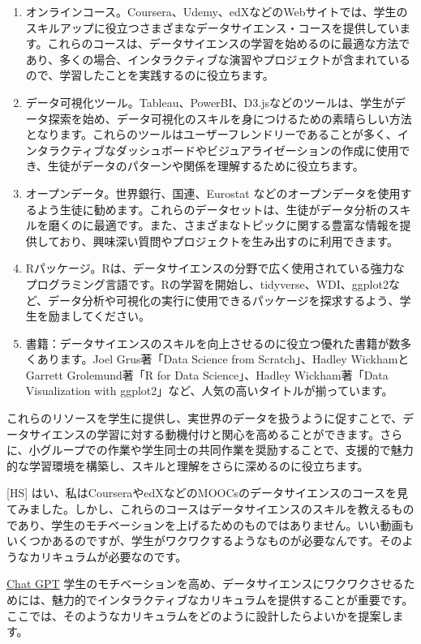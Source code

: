 \documentclass[
]{bxjsbook}
\theoremstyle{definition}
\theoremstyle{definition}
\theoremstyle{definition}
\theoremstyle{definition}
\theoremstyle{remark}
\begin{document}
\begin{enumerate}
\def\labelenumi{\arabic{enumi}.}
\item
  オンラインコース。Coursera、Udemy、edXなどのWebサイトでは、学生のスキルアップに役立つさまざまなデータサイエンス・コースを提供しています。これらのコースは、データサイエンスの学習を始めるのに最適な方法であり、多くの場合、インタラクティブな演習やプロジェクトが含まれているので、学習したことを実践するのに役立ちます。
\item
  データ可視化ツール。Tableau、PowerBI、D3.jsなどのツールは、学生がデータ探索を始め、データ可視化のスキルを身につけるための素晴らしい方法となります。これらのツールはユーザーフレンドリーであることが多く、インタラクティブなダッシュボードやビジュアライゼーションの作成に使用でき、生徒がデータのパターンや関係を理解するために役立ちます。
\item
  オープンデータ。世界銀行、国連、Eurostat などのオープンデータを使用するよう生徒に勧めます。これらのデータセットは、生徒がデータ分析のスキルを磨くのに最適です。また、さまざまなトピックに関する豊富な情報を提供しており、興味深い質問やプロジェクトを生み出すのに利用できます。
\item
  Rパッケージ。Rは、データサイエンスの分野で広く使用されている強力なプログラミング言語です。Rの学習を開始し、tidyverse、WDI、ggplot2など、データ分析や可視化の実行に使用できるパッケージを探求するよう、学生を励ましてください。
\item
  書籍：データサイエンスのスキルを向上させるのに役立つ優れた書籍が数多くあります。Joel Grus著「Data Science from Scratch」、Hadley WickhamとGarrett Grolemund著「R for Data Science」、Hadley Wickham著「Data Visualization with ggplot2」など、人気の高いタイトルが揃っています。
\end{enumerate}

これらのリソースを学生に提供し、実世界のデータを扱うように促すことで、データサイエンスの学習に対する動機付けと関心を高めることができます。さらに、小グループでの作業や学生同士の共同作業を奨励することで、支援的で魅力的な学習環境を構築し、スキルと理解をさらに深めるのに役立ちます。

{[}HS{]} はい、私はCourseraやedXなどのMOOCsのデータサイエンスのコースを見てみました。しかし、これらのコースはデータサイエンスのスキルを教えるものであり、学生のモチベーションを上げるためのものではありません。いい動画もいくつかあるのですが、学生がワクワクするようなものが必要なんです。そのようなカリキュラムが必要なのです。

\protect\hyperlink{chatgpt}{Chat GPT} 学生のモチベーションを高め、データサイエンスにワクワクさせるためには、魅力的でインタラクティブなカリキュラムを提供することが重要です。ここでは、そのようなカリキュラムをどのように設計したらよいかを提案します。
\end{document}
